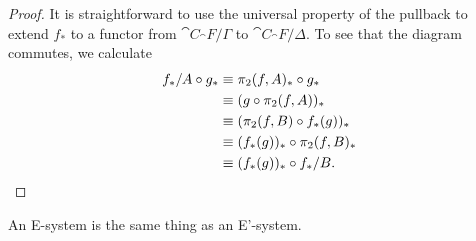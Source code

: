 \begin{proof}
It is straightforward to use the universal property of the pullback to extend
$f_\ast$ to a functor from $\cat{C}_\cat{F}/\Gamma$ to $\cat{C}_\cat{F}/\Delta$.
To see that the diagram commutes, we calculate
\begin{align*}
f_\ast/A\circ g_\ast
& \equiv
\pi_2(f,A)_\ast\circ g_\ast \\
& \equiv
(g\circ\pi_2(f,A))_\ast \\
& \equiv
(\pi_2(f,B)\circ f_\ast(g))_\ast \\
& \equiv
(f_\ast(g))_\ast\circ\pi_2(f,B)_\ast \\
& \equiv
(f_\ast(g))_\ast\circ f_\ast/B.\qedhere
\end{align*}
\end{proof}

\begin{thm}
An E-system is the same thing as an E'-system.
\end{thm}

